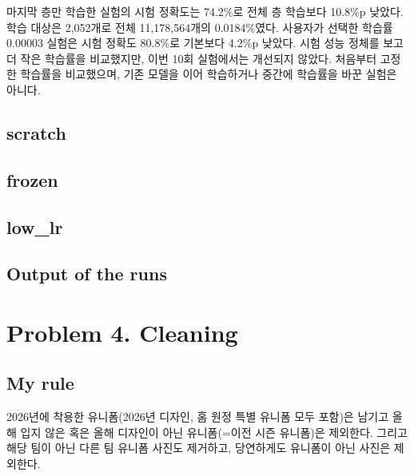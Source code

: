 \documentclass[11pt]{article}
\begin{document}
마지막 층만 학습한 실험의 시험 정확도는 74.2\%로 전체 층 학습보다 10.8\%p 낮았다. 학습 대상은 2,052개로 전체 11,178,564개의 0.0184\%였다. 사용자가 선택한 학습률 0.00003 실험은 시험 정확도 80.8\%로 기본보다 4.2\%p 낮았다. 시험 성능 정체를 보고 더 작은 학습률을 비교했지만, 이번 10회 실험에서는 개선되지 않았다. 처음부터 고정한 학습률을 비교했으며, 기존 모델을 이어 학습하거나 중간에 학습률을 바꾼 실험은 아니다.

\subsection*{scratch}
\begin{center}\end{center}
\subsection*{frozen}
\begin{center}\end{center}
\subsection*{low\_lr}
\begin{center}\end{center}
\subsection*{Output of the runs}

\section*{Problem 4. Cleaning}

\subsection*{My rule}
2026년에 착용한 유니폼(2026년 디자인, 홈 원정 특별 유니폼 모두 포함)은 남기고 올해 입지 않은 혹은 올해 디자인이 아닌 유니폼(=이전 시즌 유니폼)은 제외한다. 그리고 해당 팀이 아닌 다른 팀 유니폼 사진도 제거하고, 당연하게도 유니폼이 아닌 사진은 제외한다.
\end{document}
